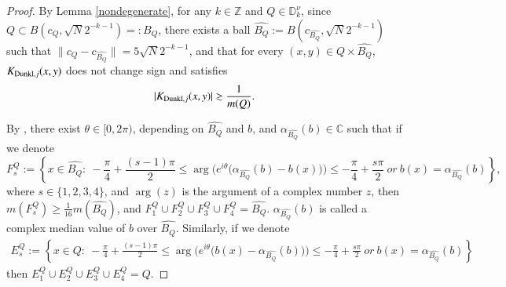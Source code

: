 \documentclass[12pt]{amsart}
\begin{document}
\begin{proof}
By Lemma \ref{nondegenerate}, for any $k\in\mathbb{Z}$ and $Q\in\mathbb{D}_k^\nu$, since $Q\subset B(c_Q,\sqrt{N}2^{-k-1})=:B_Q$,
there exists a ball $\widehat{B_Q}:=B(c_{\widehat{B_Q}},\sqrt{N}2^{-k-1})$ such that $\|c_Q-c_{\widehat{B_Q}}\|=5\sqrt{N}2^{-k-1}$, and that for every $(x,y)\in Q\times \widehat{B_Q}$, $K_{{\rm Dunkl},j}(x,y)$ does not change sign and satisfies
 \begin{align}\label{nondegeneratelower}
  |K_{{\rm Dunkl},j}(x,y)|\gtrsim\frac{1}{m(Q)}.
\end{align}


By \cite[Theorem 1.5]{Zhangwei2}, there exist $\theta\in [0,2\pi)$, depending on $\widehat{B_Q}$ and $b$, and $\alpha_{\widehat{B_Q}}(b)\in\mathbb{C}$ such that if we denote
$$F_s^Q:=\left\{x\in\widehat{B_Q}:\ -\frac{\pi}{4}+\frac{(s-1)\pi}{2}\leq \arg\Big(e^{i\theta}\big(\alpha_{\widehat{B_Q}}(b)-b(x)\big)\Big)\leq -\frac{\pi}{4}+\frac{s\pi}{2}\ or\ b(x)=\alpha_{\widehat{B_Q}}(b)\right\},$$
where $s\in\{1,2,3,4\}$, and $\arg(z)$ is the argument of a complex number $z$, then
$m(F_s^Q)\geq \frac{1}{16}m(\widehat{B_Q})$, and $F_1^Q\cup F_2^Q\cup F_3^Q\cup F_4^Q=\widehat{B_Q}$. $\alpha_{\widehat{B_Q}}(b)$ is called a complex median value of $b$ over $\widehat{B_Q}$.
Similarly, if we denote
\begin{align}
  E_s^Q:=\left\{x\in Q:\ -\frac{\pi}{4}+\frac{(s-1)\pi}{2}\leq \arg\Big(e^{i\theta}\big(b(x)-\alpha_{\widehat{B_Q}}(b)\big)\Big)\leq -\frac{\pi}{4}+\frac{s\pi}{2}\ or\ b(x)=\alpha_{\widehat{B_Q}}(b)\right\}
\end{align}
then $E_1^Q\cup E_2^Q\cup E_3^Q \cup E_4^Q= Q$.


\end{proof}
\end{document}
